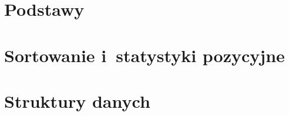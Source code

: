 \documentclass[a4paper,10pt,twoside,openany,titlepage]{book}
\begin{document}
\frontmatter




\ifpdf
\fi
\tableofcontents

\let\mychapter=\chapter
\renewcommand{\chapter}[1]{%
	\mychapter{#1}
	\setcounter{subsection}{0}
	\def\thesubsection{\thechapter.\arabic{section}-\arabic{subsection}}
	\lhead[\fancyplain{}{\small\sffamily\bfseries\thepage}]{\fancyplain{}{\small\sffamily\bfseries\rightmark}}
}

\mainmatter

\part{Podstawy}







\part{Sortowanie i~statystyki pozycyjne}






\part{Struktury danych}
\end{document}
